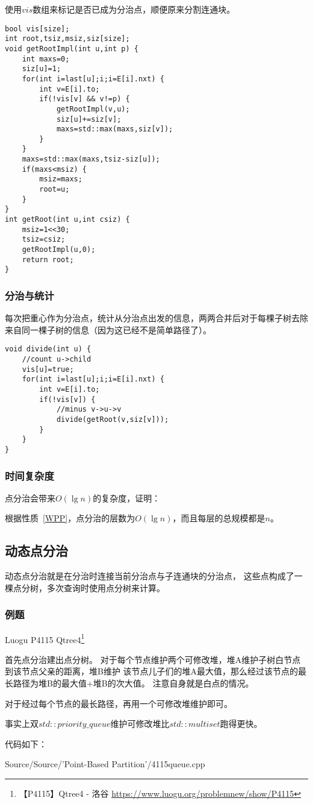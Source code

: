 使用$vis$数组来标记是否已成为分治点，顺便原来分割连通块。

\begin{lstlisting}[title=getRoot]
bool vis[size];
int root,tsiz,msiz,siz[size];
void getRootImpl(int u,int p) {
    int maxs=0;
    siz[u]=1;
    for(int i=last[u];i;i=E[i].nxt) {
        int v=E[i].to;
        if(!vis[v] && v!=p) {
            getRootImpl(v,u);
            siz[u]+=siz[v];
            maxs=std::max(maxs,siz[v]);
        }
    }
    maxs=std::max(maxs,tsiz-siz[u]);
    if(maxs<msiz) {
        msiz=maxs;
        root=u;
    }
}
int getRoot(int u,int csiz) {
    msiz=1<<30;
    tsiz=csiz;
    getRootImpl(u,0);
    return root;
}
\end{lstlisting}

\subsubsection{分治与统计}
每次把重心作为分治点，统计从分治点出发的信息，两两合并后对于每棵子树去除
来自同一棵子树的信息（因为这已经不是简单路径了）。

\begin{lstlisting}[title=divide]
void divide(int u) {
    //count u->child
    vis[u]=true;
    for(int i=last[u];i;i=E[i].nxt) {
        int v=E[i].to;
        if(!vis[v]) {
            //minus v->u->v
            divide(getRoot(v,siz[v]));
        }
    }
}
\end{lstlisting}

\subsubsection{时间复杂度}
点分治会带来$O(\lg n)$的复杂度，证明：

根据性质~\ref{WPP}，点分治的层数为$O(\lg n)$，而且每层的总规模都是$n$。

\subsection{动态点分治}
动态点分治就是在分治时连接当前分治点与子连通块的分治点，
这些点构成了一棵点分树，多次查询时使用点分树来计算。

\subsubsection{例题}

Luogu P4115 Qtree4\footnote{【P4115】Qtree4 - 洛谷
\url{https://www.luogu.org/problemnew/show/P4115}}

首先点分治建出点分树。
对于每个节点维护两个可修改堆，堆A维护子树白节点到该节点父亲的距离，堆B维护
该节点儿子们的堆A最大值，那么经过该节点的最长路径为堆B的最大值+堆B的次大值。
注意自身就是白点的情况。

对于经过每个节点的最长路径，再用一个可修改堆维护即可。

事实上双$std::priority\_queue$维护可修改堆比$std::multiset$跑得更快。

代码如下：

{Source/Source/'Point-Based Partition'/4115queue.cpp}
